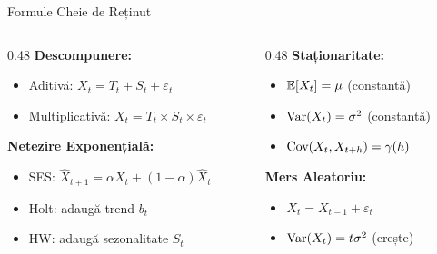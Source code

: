 \documentclass[9pt, aspectratio=169, t]{beamer}
\begin{document}
\begin{frame}{Formule Cheie de Reținut}
    \begin{columns}[T]
        \begin{column}{0.48\textwidth}
            \textbf{Descompunere:}
            \begin{itemize}
                \item Aditivă: $X_t = T_t + S_t + \varepsilon_t$
                \item Multiplicativă: $X_t = T_t \times S_t \times \varepsilon_t$
            \end{itemize}

            \vspace{0.3cm}

            \textbf{Netezire Exponențială:}
            \begin{itemize}
                \item SES: $\hat{X}_{t+1} = \alpha X_t + (1-\alpha)\hat{X}_t$
                \item Holt: adaugă trend $b_t$
                \item HW: adaugă sezonalitate $S_t$
            \end{itemize}
        \end{column}
        \begin{column}{0.48\textwidth}
            \textbf{Staționaritate:}
            \begin{itemize}
                \item $\mathbb{E}[X_t] = \mu$ (constantă)
                \item $\text{Var}(X_t) = \sigma^2$ (constantă)
                \item $\text{Cov}(X_t, X_{t+h}) = \gamma(h)$
            \end{itemize}

            \vspace{0.3cm}

            \textbf{Mers Aleatoriu:}
            \begin{itemize}
                \item $X_t = X_{t-1} + \varepsilon_t$
                \item $\text{Var}(X_t) = t\sigma^2$ (crește)
            \end{itemize}
        \end{column}
    \end{columns}
\end{frame}
\end{document}
